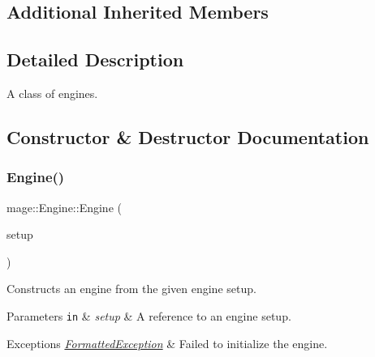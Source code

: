 \subsection*{Additional Inherited Members}


\subsection{Detailed Description}
A class of engines. 

\subsection{Constructor \& Destructor Documentation}
\hypertarget{classmage_1_1_engine_a99770cbb017b29c284d7f8e4c7e2b84c}{}\label{classmage_1_1_engine_a99770cbb017b29c284d7f8e4c7e2b84c} 
\subsubsection{\texorpdfstring{Engine()}{Engine()}\hspace{0.1cm}{\footnotesize\ttfamily [1/3]}}
{\footnotesize\ttfamily mage\+::\+Engine\+::\+Engine (\begin{DoxyParamCaption}\item[{const \hyperlink{structmage_1_1_engine_setup}{Engine\+Setup} \&}]{setup }\end{DoxyParamCaption})\hspace{0.3cm}{\ttfamily [explicit]}}

Constructs an engine from the given engine setup.


\begin{DoxyParams}[1]{Parameters}
\mbox{\tt in}  & {\em setup} & A reference to an engine setup. \\
\hline
\end{DoxyParams}

\begin{DoxyExceptions}{Exceptions}
{\em \hyperlink{structmage_1_1_formatted_exception}{Formatted\+Exception}} & Failed to initialize the engine. \\
\hline
\end{DoxyExceptions}
\hypertarget{classmage_1_1_engine_afd2f4f32b2e803f59521aafe1924f0ba}{}\label{classmage_1_1_engine_afd2f4f32b2e803f59521aafe1924f0ba} 
